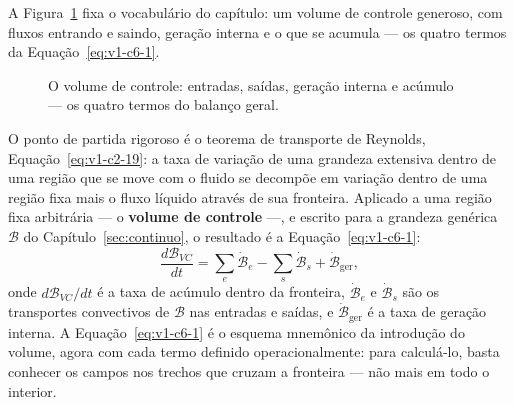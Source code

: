 \documentclass[12pt,a4paper]{article}
\numberwithin{equation}{section}
\numberwithin{table}{section}
\numberwithin{figure}{section}
\begin{document}
A Figura~\ref{fig:v1-c6-1} fixa o vocabulário do capítulo: um volume de
controle generoso, com fluxos entrando e saindo, geração interna e o que se
acumula --- os quatro termos da Equação~\eqref{eq:v1-c6-1}.

\begin{figure}[H]
\centering
{}
\caption[O volume de controle e seus quatro termos de balanço.]{O volume de
controle: entradas, saídas, geração interna e acúmulo --- os quatro termos
do balanço geral.}
\label{fig:v1-c6-1}
\end{figure}


O ponto de partida rigoroso é o teorema de transporte de Reynolds,
Equação~\eqref{eq:v1-c2-19}: a taxa de variação de uma grandeza extensiva
dentro de uma região que se move com o fluido se decompõe em variação dentro
de uma região fixa mais o fluxo líquido através de sua fronteira. Aplicado a
uma região fixa arbitrária --- o \textbf{volume de controle} ---, e escrito
para a grandeza genérica $\mathcal{B}$ do Capítulo~\ref{sec:continuo}, o
resultado é a Equação~\eqref{eq:v1-c6-1}:
\begin{equation}\label{eq:v1-c6-1}
\frac{d\mathcal{B}_{VC}}{dt} = \sum_e \dot{\mathcal{B}}_e -
\sum_s \dot{\mathcal{B}}_s + \dot{\mathcal{B}}_{\text{ger}} ,
\end{equation}
onde $d\mathcal{B}_{VC}/dt$ é a taxa de acúmulo dentro da fronteira,
$\dot{\mathcal{B}}_e$ e $\dot{\mathcal{B}}_s$ são os transportes convectivos
de $\mathcal{B}$ nas entradas e saídas, e $\dot{\mathcal{B}}_{\text{ger}}$ é a
taxa de geração interna. A Equação~\eqref{eq:v1-c6-1} é o esquema mnemônico da
introdução do volume, agora com cada termo definido operacionalmente: para
calculá-lo, basta conhecer os campos nos trechos que cruzam a fronteira --- não
mais em todo o interior.
\end{document}
